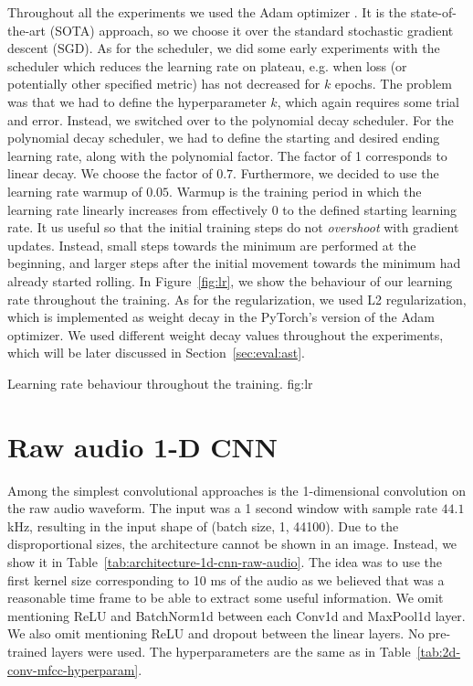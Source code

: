 Throughout all the experiments we used the Adam optimizer \cite{kingma2014adam}. It is the state-of-the-art (SOTA) approach, so we choose it over the standard stochastic gradient descent (SGD). As for the scheduler, we did some early experiments with the scheduler which reduces the learning rate on plateau, e.g. when loss (or potentially other specified metric) has not decreased for $k$ epochs. The problem was that we had to define the hyperparameter $k$, which again requires some trial and error. Instead, we switched over to the polynomial decay scheduler. For the polynomial decay scheduler, we had to define the starting and desired ending learning rate, along with the polynomial factor. The factor of 1 corresponds to linear decay. We choose the factor of $0.7$. Furthermore, we decided to use the learning rate warmup of $0.05$. Warmup is the training period in which the learning rate linearly increases from effectively 0 to the defined starting learning rate. It us useful so that the initial training steps do not \textit{overshoot} with gradient updates. Instead, small steps towards the minimum are performed at the beginning, and larger steps after the initial movement towards the minimum had already started rolling. In Figure~\ref{fig:lr}, we show the behaviour of our learning rate throughout the training. As for the regularization, we used L2 regularization, which is implemented as weight decay in the PyTorch's version of the Adam optimizer. We used different weight decay values throughout the experiments, which will be later discussed in Section~\ref{sec:eval:ast}.

	        {Learning rate behaviour throughout the training.}
                {fig:lr}

\section{Raw audio 1-D CNN}
\label{sec:raw-audio-1d-cnn}
Among the simplest convolutional approaches is the 1-dimensional convolution on the raw audio waveform. The input was a 1 second window with sample rate $44.1$ kHz, resulting in the input shape of (batch size, 1, 44100). Due to the disproportional sizes, the architecture cannot be shown in an image. Instead, we show it in Table~\ref{tab:architecture-1d-cnn-raw-audio}. The idea was to use the first kernel size corresponding to 10 ms of the audio as we believed that was a reasonable time frame to be able to extract some useful information. We omit mentioning ReLU and BatchNorm1d between each Conv1d and MaxPool1d layer. We also omit mentioning ReLU and dropout between the linear layers. No pre-trained layers were used. The hyperparameters are the same as in Table~\ref{tab:2d-conv-mfcc-hyperparam}.

